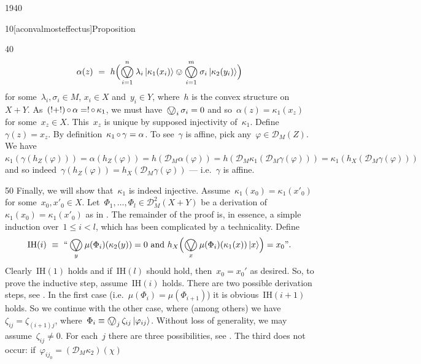 \begin{parsec}{1940}
\begin{point}{10}[aconvalmosteffectus]{Proposition}
\begin{point}{40}
\begin{equation*}
    \alpha(z) \ =\  h 
    \Bigl( \bigovee^n_{i=1} \lambda_i \ket{\kappa_1(x_i)}
    \ovee \bigovee^m_{i=1} \sigma_i \ket{\kappa_2(y_i)} \Bigr)
\end{equation*}
for some~$\lambda_i,\sigma_i \in M $, 
$x_i \in X$ and~$y_i \in Y$,
where~$h$ is the convex structure on~$X+Y$.
As~$(!+!) \mathop{\circ} \alpha = ! \mathop{\circ} \kappa_1$,
    we must have~$\bigovee_i \sigma_i = 0$
    and so~$\alpha(z) = \kappa_1(x_z)$
    for some~$x_z \in X$.
This~$x_z$ is unique by supposed injectivity of~$\kappa_1$.
    Define~$\gamma(z) = x_z$.
By definition~$\kappa_1 \mathop{\circ} \gamma = \alpha$.
To see~$\gamma$ is affine, pick any~$\varphi \in \mathcal{D}_M (Z)$.
We have
$
\kappa_1 ( \gamma ( h_Z (\varphi )))
    = \alpha(h_Z (\varphi))
    = h(\mathcal{D}_M\alpha(\varphi))
    = h(\mathcal{D}_M\kappa_1 ( \mathcal{D}_M \gamma(\varphi)))
    = \kappa_1  (h_X( \mathcal{D}_M \gamma(\varphi)))
$ and
so indeed~$\gamma(h_Z(\varphi)) = h_X(\mathcal{D}_M \gamma (\varphi))$
    --- i.e.~$\gamma$ is affine.
\end{point}
\begin{point}{50}%
Finally, we will show that~$\kappa_1$ is indeed injective.
Assume~$\kappa_1(x_0) = \kappa_1(x'_0)$
for some~$x_0,x'_0 \in X$.
    Let~$\Phi_1, \ldots, \Phi_l \in \mathcal{D}_M^2{(X+Y)}$
    be a derivation
    of~$\kappa_1(x_0) = \kappa_1(x'_0)$
    as in .
The remainder of the proof is, in essence, a simple induction
    over~$1 \leq i < l$, which has been complicated
    by a technicality.
Define
\begin{equation*}
    \mathrm{IH}(i) \ \equiv \ \text{``}
    \bigovee_y \mu(\Phi_i)(\kappa_2 (y)) = 0
        \text{ and }
        h_X\Bigl(\bigovee_{x} \mu(\Phi_i)(\kappa_1(x)) \ket{x}\Bigr)
        =    x_0 \text{''}.
\end{equation*}
Clearly~$\mathrm{IH}(1)$ holds
    and if~$\mathrm{IH}(l)$ should hold,
    then~$x_0 = x_0'$ as desired.
So, to prove the inductive step, assume~$\mathrm{IH}(i)$ holds.
There are two possible derivation steps, see .
In the first case (i.e.~$\mu(\Phi_i) = \mu(\Phi_{i+1})$)
    it is obvious~$\mathrm{IH}(i+1)$ holds.
So we continue with the other case,
where (among others) we have~$\zeta_{ij} = \zeta_{(i+1)j}$,
    where~$\Phi_i \equiv \bigovee_j \zeta_{ij} \ket{\varphi_{ij}}$.
Without loss of generality, we may assume~$\zeta_{ij} \neq 0$.
For each~$j$ there are three possibilities, see .
The third does not occur:
if~$\varphi_{ij_0} = (\mathcal{D}_M \kappa_2) (\chi)$

\end{point}
\end{point}
\end{parsec}

